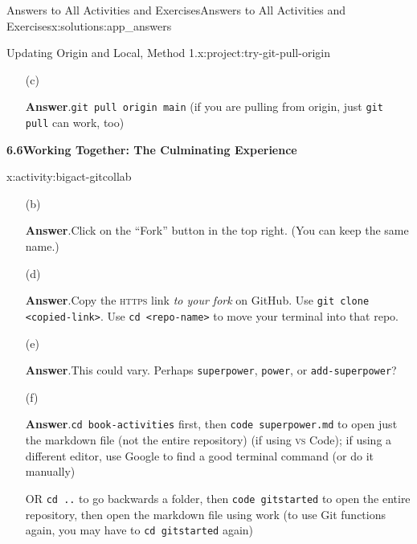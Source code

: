 \documentclass[oneside,10pt,]{book}
\newcommand{\blocktitlefont}{\relax}
\newcommand{\mono}[1]{\texttt{#1}}
\newcommand{\initialism}[1]{\textsc{\MakeLowercase{#1}}}
\begin{document}
\begin{solutions-chapter}{Answers to All Activities and Exercises}{}{Answers to All Activities and Exercises}{}{}{x:solutions:app_answers}
\begin{projectsolution}{6.1}{Updating Origin and Local, Method 1.}{x:project:try-git-pull-origin}%
\begin{enumerate}[font=\bfseries,label=(\alph*),ref=\alph*]
\item[(c)]\par\smallskip%
\noindent\textbf{\blocktitlefont Answer}.\hypertarget{g:answer:idm479330920-back}{}\quad{}\mono{git pull origin main} (if you are pulling from origin, just \mono{git pull} can work, too)%
\end{enumerate}
\end{projectsolution}%
\par\medskip
\noindent\textbf{\Large{}6.6\space\textperiodcentered\space{}Working Together: The Culminating Experience}
\begin{activitysolution}{6.3}{}{x:activity:bigact-gitcollab}%
\begin{enumerate}[font=\bfseries,label=(\alph*),ref=\alph*]
\item[(b)]\par\smallskip%
\noindent\textbf{\blocktitlefont Answer}.\hypertarget{g:answer:idm479289704-back}{}\quad{}Click on the ``Fork'' button in the top right. (You can keep the same name.)%
\item[(d)]\par\smallskip%
\noindent\textbf{\blocktitlefont Answer}.\hypertarget{g:answer:idm479283560-back}{}\quad{}Copy the \initialism{HTTPS} link \emph{to your fork} on GitHub. Use \mono{git clone <copied-link>}. Use \mono{cd <repo-name>} to move your terminal into that repo.%
\item[(e)]\par\smallskip%
\noindent\textbf{\blocktitlefont Answer}.\hypertarget{g:answer:idm479278312-back}{}\quad{}This could vary. Perhaps \mono{superpower}, \mono{power}, or \mono{add-superpower}?%
\item[(f)]\par\smallskip%
\noindent\textbf{\blocktitlefont Answer}.\hypertarget{g:answer:idm479282664-back}{}\quad{}\mono{cd book-activities} first, then \mono{code superpower.md} to open just the markdown file (not the entire repository) (if using \initialism{VS} Code); if using a different editor, use Google to find a good terminal command (or do it manually)%
\par
OR \mono{cd ..} to go backwards a folder, then \mono{code gitstarted} to open the entire repository, then open the markdown file using work (to use Git functions again, you may have to \mono{cd gitstarted} again)%

\end{enumerate}
\end{activitysolution}
\end{solutions-chapter}
\end{document}
